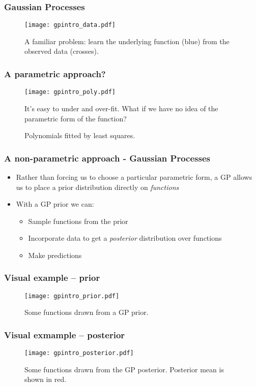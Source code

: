 
\begin{frame}
	\frametitle{Gaussian Processes}
	\begin{figure}[tbh]
		\texttt{[image: gpintro\_data.pdf]}		
		\centering\caption{\label{fig:gpintro_data}A familiar problem: learn the underlying function (blue) from the observed data (crosses).}
	\end{figure}
\end{frame}

\begin{frame}
	\frametitle{A parametric approach?}
	\begin{figure}[tbh]
		\texttt{[image: gpintro\_poly.pdf]}		
		\centering\caption{\label{fig:gpintro_poly}Polynomials fitted by least squares.}
		It's easy to under and over-fit. What if we have no idea of the parametric form of the function?
	\end{figure}
\end{frame}

\begin{frame}
	\frametitle{A non-parametric approach - Gaussian Processes}
	\begin{itemize}
		\item Rather than forcing us to choose a particular parametric form, a \ac{GP} allows us to place a prior distribution directly on \emph{functions}
		\item With a \ac{GP} prior we can:
		\begin{itemize}
			\item Sample functions from the prior
			\item Incorporate data to get a \emph{posterior} distribution over functions
			\item Make predictions
		\end{itemize}
	\end{itemize}
\end{frame}

\begin{frame}
	\frametitle{Visual example -- prior}
	\begin{figure}[tbh]
		\texttt{[image: gpintro\_prior.pdf]}		
		\centering\caption{\label{fig:gpintro_prior}Some functions drawn from a \ac{GP} prior.}
	\end{figure}
\end{frame}

\begin{frame}
	\frametitle{Visual exmample -- posterior}
	\begin{figure}[tbh]
		\texttt{[image: gpintro\_posterior.pdf]}		
		\centering\caption{\label{fig:gpintro_posterior}Some functions drawn from the \ac{GP} posterior. Posterior mean is shown in red.}
	\end{figure}
\end{frame}

